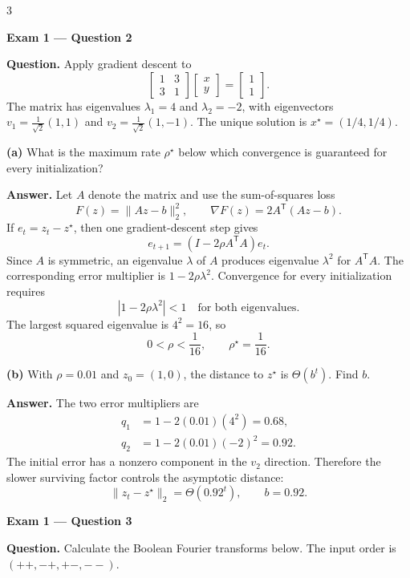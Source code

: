 \documentclass[10pt]{article}
\newcommand{\examlabel}[1]{%
  \par\noindent\textbf{#1}\par\vspace{1pt}}
\newcommand{\question}[1]{\par\noindent\textbf{Question.} #1\par}
\newcommand{\answer}{\par\noindent\textbf{Answer.} }
\begin{document}
\fontsize{8.2}{9.45}\selectfont

\begin{multicols*}{3}

\examlabel{Exam 1 --- Question 2}
\question{Apply gradient descent to
\[
  \begin{bmatrix}1&3\\3&1\end{bmatrix}
  \begin{bmatrix}x\\y\end{bmatrix}
  =
  \begin{bmatrix}1\\1\end{bmatrix}.
\]
The matrix has eigenvalues $\lambda_1=4$ and $\lambda_2=-2$, with
eigenvectors
$v_1=\frac1{\sqrt2}(1,1)$ and $v_2=\frac1{\sqrt2}(1,-1)$.
The unique solution is $x^\star=(1/4,1/4)$.}

\textbf{(a)} What is the maximum rate $\rho^\star$ below which convergence
is guaranteed for every initialization?

\answer Let $A$ denote the matrix and use the sum-of-squares loss
\[
  F(z)=\lVert Az-b\rVert_2^2,
  \qquad
  \nabla F(z)=2A^\mathsf{T}(Az-b).
\]
If $e_t=z_t-z^\star$, then one gradient-descent step gives
\[
  e_{t+1}=(I-2\rho A^\mathsf{T}A)e_t.
\]
Since $A$ is symmetric, an eigenvalue $\lambda$ of $A$ produces eigenvalue
$\lambda^2$ for $A^\mathsf{T}A$.  The corresponding error multiplier is
$1-2\rho\lambda^2$.  Convergence for every initialization requires
\[
  |1-2\rho\lambda^2|<1
  \quad\text{for both eigenvalues.}
\]
The largest squared eigenvalue is $4^2=16$, so
\[
  0<\rho<\frac1{16},
  \qquad
  \boxed{\rho^\star=\frac1{16}}.
\]

\textbf{(b)} With $\rho=0.01$ and $z_0=(1,0)$, the distance to $z^\star$
is $\Theta(b^t)$. Find $b$.

\answer The two error multipliers are
\[
  \begin{aligned}
  q_1&=1-2(0.01)(4^2)=0.68,\\
  q_2&=1-2(0.01)(-2)^2=0.92.
  \end{aligned}
\]
The initial error has a nonzero component in the $v_2$ direction.
Therefore the slower surviving factor controls the asymptotic distance:
\[
  \lVert z_t-z^\star\rVert_2=\Theta(0.92^t),
  \qquad
  \boxed{b=0.92}.
\]

\examlabel{Exam 1 --- Question 3}
\question{Calculate the Boolean Fourier transforms below.  The input order
is $(++,-+,+-,--)$.}


\end{multicols*}
\end{document}
